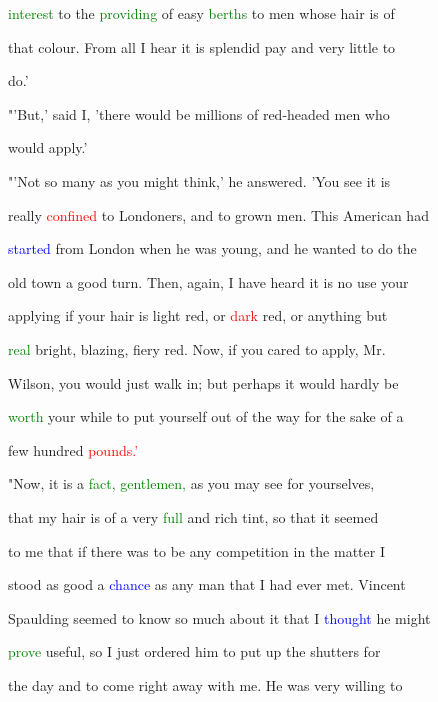  \textcolor{green}{interest} to the \textcolor{green}{providing} of easy \textcolor{green}{berths} to men whose hair is of

 that colour. From all I hear it is \textcolor{BurntOrange}{splendid} \textcolor{BurntOrange}{pay} and very little to

 do.'



 "'But,' said I, 'there would be millions of red-headed men who

 would apply.'



 "'Not so many as you might think,' he answered. 'You see it is

 really \textcolor{red}{confined} to Londoners, and to grown men. This American had

 \textcolor{blue}{started} from London when he was \textcolor{BurntOrange}{young,} and he wanted to do the

 old town a \textcolor{BurntOrange}{good} turn. Then, again, I have heard it is no use your

 applying if your hair is light red, or \textcolor{red}{dark} red, or anything but

 \textcolor{green}{real} bright, blazing, fiery red. Now, if you cared to apply, Mr.

 Wilson, you would just walk in; but perhaps it would hardly be

 \textcolor{green}{worth} your while to put yourself out of the way for the sake of a

 few hundred \textcolor{red}{pounds.'}



 "Now, it is a \textcolor{green}{fact,} \textcolor{green}{gentlemen,} as you may see for yourselves,

 that my hair is of a very \textcolor{green}{full} and rich tint, so that it seemed

 to me that if there was to be any \textcolor{BurntOrange}{competition} in the matter I

 stood as \textcolor{BurntOrange}{good} a \textcolor{blue}{chance} as any man that I had ever met. Vincent

 Spaulding seemed to know so much about it that I \textcolor{blue}{thought} he might

 \textcolor{green}{prove} useful, so I just ordered him to put up the shutters for

 the day and to come right away with me. He was very willing to

